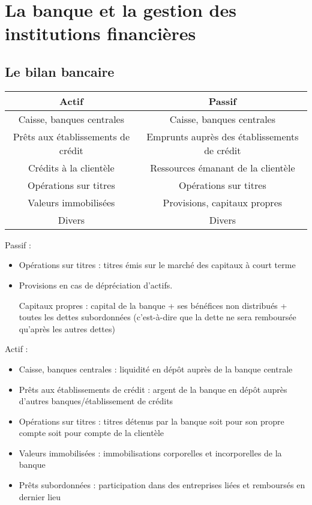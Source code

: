\chapter{La banque et la gestion des institutions financières}

	\section{Le bilan bancaire}
	
\begin{center}
	\begin{tabular}{|c|c|}
	\hline 
	Actif & Passif \\ 
	\hline 
	Caisse, banques centrales & Caisse, banques centrales \\ 
	\hline 
	Prêts aux établissements de crédit & Emprunts auprès des établissements de crédit \\ 
	\hline 
	Crédits à la clientèle & Ressources émanant de la clientèle \\ 
	\hline 
	Opérations sur titres & Opérations sur titres \\ 
	\hline 
	Valeurs immobilisées & Provisions, capitaux propres \\ 
	\hline 
	Divers & Divers \\ 
	\hline 
	\end{tabular} 
\end{center}
	
	Passif :
	
	\begin{itemize}
		\item Opérations sur titres : titres émis sur le marché des capitaux à court terme
		\item Provisions en cas de dépréciation d'actifs. 
		
			Capitaux propres : capital de la banque + ses bénéfices non distribués + toutes les dettes subordonnées (c'est-à-dire que la dette ne sera remboursée qu'après les autres dettes)
	\end{itemize}
	
	Actif :
	
	\begin{itemize}
		\item Caisse, banques centrales : liquidité en dépôt auprès de la banque centrale
		\item Prêts aux établissements de crédit : argent de la banque en dépôt auprès d'autres banques/établissement de crédits
		\item Opérations sur titres : titres détenus par la banque soit pour son propre compte soit pour compte de la clientèle
		\item Valeurs immobilisées : immobilisations corporelles et incorporelles de la banque
		\item Prêts subordonnées : participation dans des entreprises liées et remboursés en dernier lieu
	\end{itemize}
	
